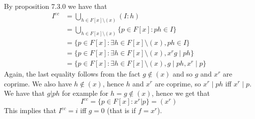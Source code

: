 \documentclass{article}
\begin{document}
By proposition 7.3.0 we have that
\begin{align*}
	I^{ec} &= \bigcup_{h \in F[x]\setminus(x)} (I : h)\\
	&= \bigcup_{h \in F[x]\setminus(x)} \{p \in F[x] : ph \in I \}\\
	&= \{p \in F[x] : \exists h \in F[x]\setminus(x), ph \in I \}\\
	&= \{p \in F[x] : \exists h \in F[x]\setminus(x), x^rg \mid ph \}\\
	&= \{p \in F[x] : \exists h \in F[x]\setminus(x), g \mid ph,
	x^r \mid p \}
\end{align*}
Again, the last equality follows from the fact $g \not\in (x)$ and so 
$g$ and $x^r$ are coprime. We also have $h \not\in (x)$, hence $h$ and
$x^r$ are coprime, so $x^r \mid ph$ iff $x^r \mid p$.
We have that $g | ph$ for example for $h = g \not\in (x)$, hence we get
that
\begin{equation*}
	I^{ec} = \{p \in F[x] : x^r | p\} = (x^r)
\end{equation*}
This implies that $I^{ec} = i$ iff $g = 0$ (that is if $f = x^r$).
\end{document}
